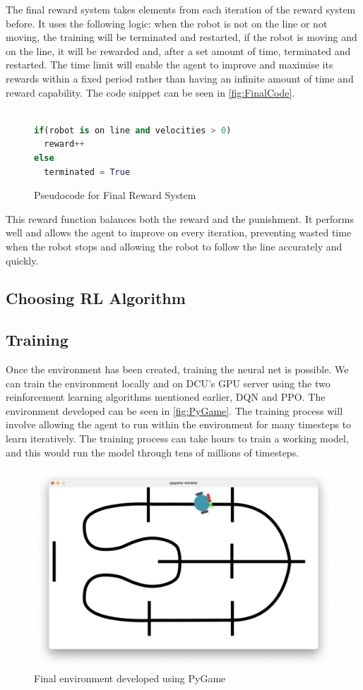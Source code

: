 \documentclass[a4paper,12pt]{article}
\begin{document}
The final reward system takes elements from each iteration of the reward system before. It uses the following logic: when the robot is not on the line or not moving, the training will be terminated and restarted, if the robot is moving and on the line, it will be rewarded and, after a set amount of time, terminated and restarted. The time limit will enable the agent to improve and maximise its rewards within a fixed period rather than having an infinite amount of time and reward capability. The code snippet can be seen in \autoref{fig:FinalCode}.
\\\\
\begin{figure}[H]
\begin{lstlisting}[language=Python]
if(robot is on line and velocities > 0)
  reward++
else
  terminated = True
\end{lstlisting}
\caption{Pseudocode for Final Reward System}
\label{fig:FinalCode}
\end{figure}
\noindent
This reward function balances both the reward and the punishment. It performs well and allows the agent to improve on every iteration, preventing wasted time when the robot stops and allowing the robot to follow the line accurately and quickly.

\subsection{Choosing RL Algorithm}

\subsection{Training}
Once the environment has been created, training the neural net is possible. We can train the environment locally and on DCU's GPU server using the two reinforcement learning algorithms mentioned earlier, DQN and PPO. The environment developed can be seen in \autoref{fig:PyGame}. The training process will involve allowing the agent to run within the environment for many timesteps to learn iteratively. The training process can take hours to train a working model, and this would run the model through tens of millions of timesteps. 

\begin{figure}[H]
\centering
\includegraphics[width=12cm]{./imgs/PyGame.png}
\caption{Final environment developed using PyGame}
\label{fig:PyGame}

\end{figure}
\end{document}
